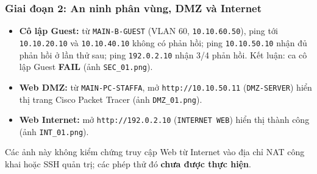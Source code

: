 \subsubsection{Giai đoạn 2: An ninh phân vùng, DMZ và Internet}
\begin{itemize}[noitemsep,topsep=2pt]
    \item \textbf{Cô lập Guest:} từ \texttt{MAIN-B-GUEST} (VLAN 60, \texttt{10.10.60.50}), ping tới \texttt{10.10.20.10} và \texttt{10.10.40.10} không có phản hồi; ping \texttt{10.10.50.10} nhận đủ phản hồi ở lần thử sau; ping \texttt{192.0.2.10} nhận 3/4 phản hồi. Kết luận: ca cô lập Guest \textbf{FAIL} (ảnh \texttt{SEC\_01.png}).
    \item \textbf{Web DMZ:} từ \texttt{MAIN-PC-STAFFA}, mở \texttt{http://10.10.50.11} (\texttt{DMZ-SERVER}) hiển thị trang Cisco Packet Tracer (ảnh \texttt{DMZ\_01.png}).
    \item \textbf{Web Internet:} mở \texttt{http://192.0.2.10} (\texttt{INTERNET WEB}) hiển thị thành công (ảnh \texttt{INT\_01.png}).
\end{itemize}
Các ảnh này không kiểm chứng truy cập Web từ Internet vào địa chỉ NAT công khai hoặc SSH quản trị; các phép thử đó \textbf{chưa được thực hiện}.

